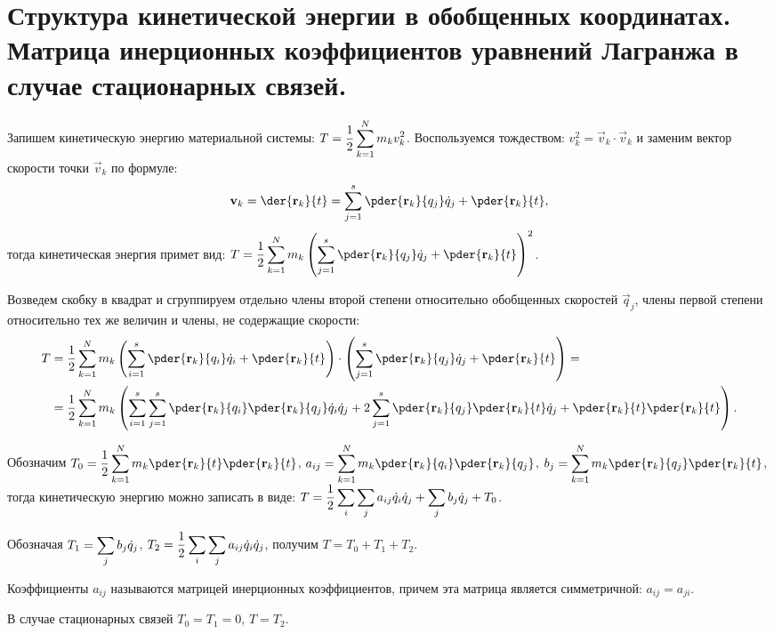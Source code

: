 \chapter{Структура кинетической энергии в обобщенных координатах. Матрица
инерционных коэффициентов уравнений Лагранжа в случае стационарных связей.}

Запишем кинетическую энергию материальной системы:
\( \displaystyle T = \frac{1}{2}\sum_{k=1}^N m_k v_k^2 \). Воспользуемся тождеством:
\( v_k^2 = \vec{v}_k\cdot\vec{v}_k \) и заменим вектор скорости точки
\( \vec{v}_k \) по формуле:
\[
    \vec{v}_k =\der{\vec{r}_k}{t} = \sum_{j=1}^s \pder{\vec{r}_k}{q_j}\dot{q}_j
    + \pder{\vec{r}_k}{t},
\]
тогда кинетическая энергия примет вид: \( \ds T = \frac{1}{2}\sum_{k=1}^N m_k
\left(\sum_{j=1}^s \pder{\vec{r}_k}{q_j}\dot{q}_j +
\pder{\vec{r}_k}{t}\right)^2 \).

Возведем скобку в квадрат и сгруппируем отдельно члены второй степени
относительно обобщенных скоростей \( \vec{q}_j \), члены первой степени
относительно тех же величин и члены, не содержащие скорости:
\begin{align*}
    T & = \frac{1}{2} \sum_{k=1}^N m_k\left( \sum_{i=1}^s \pder{\vec{r}_k}{q_i}
    \dot{q}_i + \pder{\vec{r}_k}{t} \right) \cdot \left( \sum_{j=1}^s
    \pder{\vec{r}_k}{q_j}\dot{q}_j + \pder{\vec{r}_k}{t} \right) = \\
    & =\frac{1}{2}\sum_{k=1}^N m_k\left( \sum_{i=1}^s\sum_{j=1}^s
    \pder{\vec{r}_k}{q_i}\pder{\vec{r}_k}{q_j}\dot{q}_i\dot{q}_j + 2\sum_{j=1}^s
    \pder{\vec{r}_k}{q_j}\pder{\vec{r}_k}{t}\dot{q}_j + \pder{\vec{r}_k}{t}
    \pder{\vec{r}_k}{t}\right).
\end{align*}

Обозначим \( \ds T_0 = \frac{1}{2}\sum_{k=1}^N m_k\pder{\vec{r}_k}{t}
\pder{\vec{r}_k}{t} \), \( \ds a_{ij} = \sum_{k=1}^N m_k \pder{\vec{r}_k}{q_i}
\pder{\vec{r}_k}{q_j} \), \( \ds b_j = \sum_{k=1}^N m_k \pder{\vec{r}_k}{q_j}
\pder{\vec{r}_k}{t} \), тогда кинетическую энергию можно записать в виде:
\( \displaystyle T = \frac{1}{2} \sum_i\sum_j a_{ij}\dot{q}_i\dot{q}_j +
\sum_j b_j\dot{q}_j + T_0 \).

Обозначая \( \displaystyle T_1 = \sum_j b_j\dot{q}_j \),
\( \displaystyle T_2 = \frac{1}{2} \sum_i\sum_j a_{ij}\dot{q}_i\dot{q}_j \), получим
\( T = T_0 + T_1 + T_2 \).

Коэффициенты \( a_{ij} \) называются матрицей инерционных коэффициентов, причем
эта матрица является симметричной: \( a_{ij} = a_{ji} \).

В случае стационарных связей \( T_0 = T_1 = 0 \), \( T = T_2 \).


\newpage
